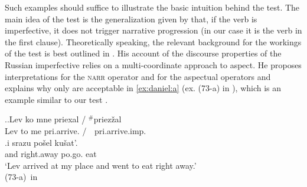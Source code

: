 Such examples should suffice to illustrate the basic intuition behind the test. The main idea of the test is the generalization given by \citet{Jespersen:24} that, if the verb is imperfective, it does not trigger narrative progression (in our case it is the verb in the first clause). Theoretically speaking, the relevant background for the workings of the test is best outlined in \citet{Altshuler:12}.
His account of the discourse properties of the Russian imperfective  relies on a multi-coordinate approach to aspect. He proposes interpretations for the \textsc{narr} operator and for the aspectual operators and explains why only  are acceptable in \ref{ex:daniel:a} (ex. (73-a) in \citealt{Altshuler:12}), which is an example similar to our test .

\ex.\label{ex:daniel}\ag.\label{ex:daniel:a}Lev ko mne \textsuperscript{\JudgeOK}priexal\textsuperscript{\PF} / {{$^{\#}$}priez\v{z}al\textsuperscript{\IPF}}\\
Lev to me {pri.arrive.} / {{\textcolor{white} {$^{\#}$}}pri.arrive.imp.}\\
\bg.i srazu po\v{s}el\textsuperscript{\PF} ku\v{s}at'.\\
and right.away po.go. eat\\
\trans `Lev arrived at my place and went to eat right away.'\\
\hbox{}\hfill\hbox{(73-a) in \citet{Altshuler:12}}


